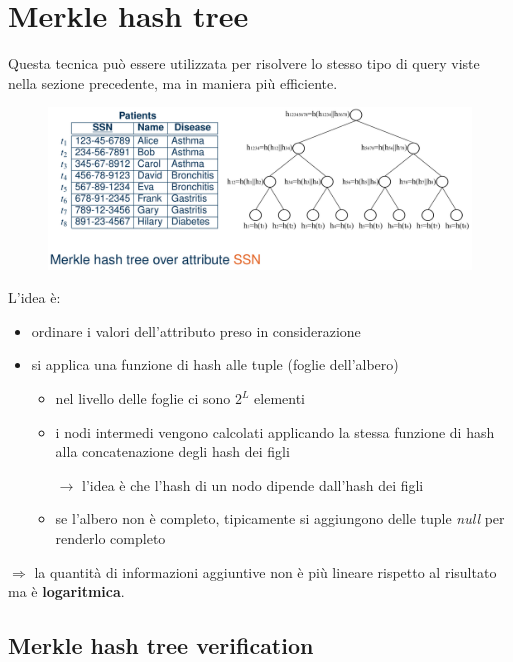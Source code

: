 \documentclass{report}
\begin{document}
\newpage
\section{Merkle hash tree}
Questa tecnica può essere utilizzata per risolvere lo stesso tipo di query viste 
nella sezione precedente, ma in maniera più efficiente. 

\begin{figure}[H]
    \centering
    \includegraphics[width=1\linewidth]{images/merkle-hashtree.png}
\end{figure}

L'idea è:
\begin{itemize}
    \item ordinare i valori dell'attributo preso in considerazione
    \item si applica una funzione di hash alle tuple (foglie dell'albero)
    \begin{itemize}
        \item nel livello delle foglie ci sono $2^L$ elementi
        \item i nodi intermedi vengono calcolati applicando la stessa funzione di hash 
        alla concatenazione degli hash dei figli 

        \noindent $\rightarrow$ l'idea è che l'hash di un nodo dipende dall'hash dei figli
        \item se l'albero non è completo, tipicamente si aggiungono delle tuple \textit{null} per renderlo completo 
    \end{itemize}
\end{itemize}

$\Rightarrow$ la quantità di informazioni aggiuntive non è più lineare rispetto al risultato 
ma è \textbf{logaritmica}.

\subsection{Merkle hash tree verification}
\end{document}
